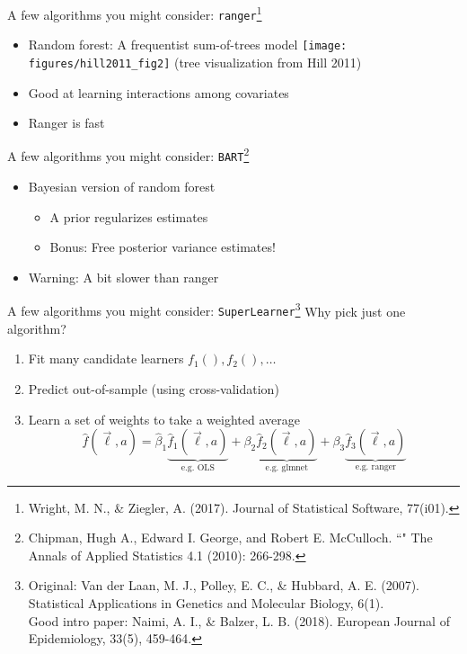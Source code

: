 \documentclass{beamer}
\newcommand\bref[2]{\href{#1}{\color{blue}{#2}}}
\begin{document}
\begin{frame}{A few algorithms you might consider: \texttt{ranger}\footnote{Wright, M. N., \& Ziegler, A. (2017). \bref{http://dx.doi.org/10.18637/jss.v077.i01}{ranger: A fast implementation of random forests for high dimensional data in C++ and R.} Journal of Statistical Software, 77(i01).}}
\begin{itemize}
\item Random forest: A frequentist sum-of-trees model
\texttt{[image: figures/hill2011\_fig2]} {\footnotesize (tree visualization from Hill 2011)}
\item Good at learning interactions among covariates
\item Ranger is fast
\end{itemize}
\end{frame}

\begin{frame}{A few algorithms you might consider: \texttt{BART}\footnote{Chipman, Hugh A., Edward I. George, and Robert E. McCulloch. ``\bref{https://projecteuclid.org/journals/annals-of-applied-statistics/volume-4/issue-1/BART-Bayesian-additive-regression-trees/10.1214/09-AOAS285.full}{BART: Bayesian additive regression trees.}" The Annals of Applied Statistics 4.1 (2010): 266-298.}}
\begin{itemize}
\item Bayesian version of random forest
\begin{itemize}
\item A prior regularizes estimates
\item Bonus: Free posterior variance estimates!
\end{itemize}
\item Warning: A bit slower than ranger
\end{itemize}
\end{frame}

\begin{frame}{A few algorithms you might consider: \texttt{SuperLearner}\footnote{Original: Van der Laan, M. J., Polley, E. C., \& Hubbard, A. E. (2007). \bref{https://www.degruyter.com/document/doi/10.2202/1544-6115.1309/html}{Super learner.} Statistical Applications in Genetics and Molecular Biology, 6(1).\\Good intro paper: Naimi, A. I., \& Balzer, L. B. (2018). \bref{https://link.springer.com/article/10.1007/s10654-018-0390-z}{Stacked generalization: an introduction to super learning.} European Journal of Epidemiology, 33(5), 459-464.}}
Why pick just one algorithm?
\begin{enumerate}
\item Fit many candidate learners $f_1(),f_2(),\dots$
\item Predict out-of-sample (using cross-validation)
\item Learn a set of weights to take a weighted average
$$\hat{f}(\vec\ell,a) = \hat\beta_1\underbrace{\hat{f}_1(\vec\ell,a)}_\text{e.g.~OLS} + \beta_2\underbrace{\hat{f}_2(\vec\ell,a)}_\text{e.g.~glmnet} + \beta_3\underbrace{\hat{f}_3(\vec\ell,a)}_\text{e.g.~ranger}$$
\end{enumerate}
\end{frame}
\end{document}
